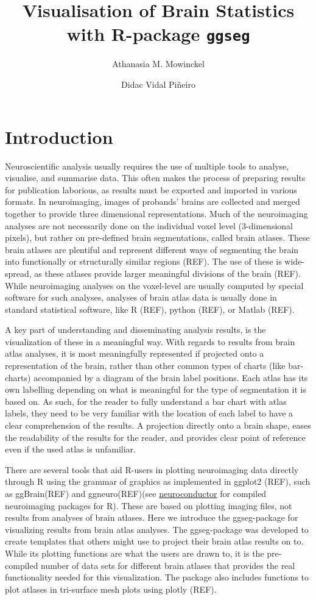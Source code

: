 \documentclass[fleqn,10pt]{wlpeerj} %
\title{Visualisation of Brain Statistics with R-package \texttt{ggseg}}
\author[1]{Athanasia M. Mowinckel}
\author[1]{Didac Vidal Piñeiro}
\affil[1]{Center for Lifespan Changes in Brain and Cognition, Univeristy of Oslo, PO. box 1094 Blindern, 0317 Oslo, Norway}
\begin{document}
\flushbottom
\maketitle
\thispagestyle{empty}

\hypertarget{introduction}{%
\section{Introduction}\label{introduction}}

Neuroscientific analysis usually requires the use of multiple tools to analyse, visualise, and summarise data.
This often makes the process of preparing results for publication laborious, as results must be exported and imported in various formats.
In neuroimaging, images of probands' brains are collected and merged together to provide three dimensional representations.
Much of the neuroimaging analyses are not necessarily done on the individual voxel level (3-dimensional pixels), but rather on pre-defined brain segmentations, called brain atlases.
These brain atlases are plentiful and represent different ways of segmenting the brain into functionally or structurally similar regions (REF).
The use of these is wide-spread, as these atlases provide larger meaningful divisions of the brain (REF).
While neuroimaging analyses on the voxel-level are usually computed by special software for such analyses, analyses of brain atlas data is usually done in standard statistical software, like R (REF), python (REF), or Matlab (REF).

A key part of understanding and disseminating analysis results, is the visualization of these in a meaningful way.
With regards to results from brain atlas analyses, it is most meaningfully represented if projected onto a representation of the brain, rather than other common types of charts (like bar-charts) accompanied by a diagram of the brain label positions.
Each atlas has its own labelling depending on what is meaningful for the type of segmentation it is based on.
As such, for the reader to fully understand a bar chart with atlas labels, they need to be very familiar with the location of each label to have a clear comprehension of the results.
A projection directly onto a brain shape, eases the readability of the results for the reader, and provides clear point of reference even if the used atlas is unfamiliar.

There are several tools that aid R-users in plotting neuroimaging data directly through R using the grammar of graphics as implemented in ggplot2 (REF), such as ggBrain(REF) and ggneuro(REF)(see \href{https://neuroconductor.org/}{neuroconductor} for compiled neuroimaging packages for R).
These are based on plotting imaging files, not results from analyses of brain atlases.
Here we introduce the ggseg-package for visualizing results from brain atlas analyses.
The ggseg-package was developed to create templates that others might use to project their brain atlas results on to.
While its plotting functions are what the users are drawn to, it is the pre-compiled number of data sets for different brain atlases that provides the real functionality needed for this visualization.
The package also includes functions to plot atlases in tri-surface mesh plots using plotly (REF).
\end{document}
